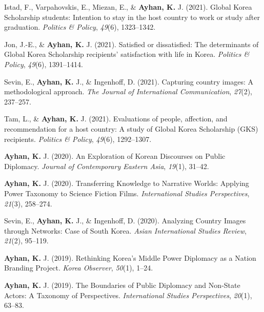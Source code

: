 \documentclass[11pt,a4paper,]{awesome-cv}
\begin{document}
\leavevmode{}%
Istad, F., Varpahovskis, E., Miezan, E., \& \textbf{Ayhan, K.} J.
(2021). Global {Korea} {Scholarship} students: {Intention} to stay in
the host country to work or study after graduation. \emph{Politics \&
Policy}, \emph{49}(6), 1323--1342.

\leavevmode{}%
Jon, J.-E., \& \textbf{Ayhan, K.} J. (2021). Satisfied or dissatisfied:
{The} determinants of {Global} {Korea} {Scholarship} recipients'
satisfaction with life in {Korea}. \emph{Politics \& Policy},
\emph{49}(6), 1391--1414.

\leavevmode{}%
Sevin, E., \textbf{Ayhan, K.} J., \& Ingenhoff, D. (2021). Capturing
country images: A methodological approach. \emph{The Journal of
International Communication}, \emph{27}(2), 237--257.

\leavevmode{}%
Tam, L., \& \textbf{Ayhan, K.} J. (2021). Evaluations of people,
affection, and recommendation for a host country: {A} study of {Global}
{Korea} {Scholarship} ({GKS}) recipients. \emph{Politics \& Policy},
\emph{49}(6), 1292--1307.

\leavevmode{}%
\textbf{Ayhan, K.} J. (2020). An {Exploration} of {Korean} {Discourses}
on {Public} {Diplomacy}. \emph{Journal of Contemporary Eastern Asia},
\emph{19}(1), 31--42.

\leavevmode{}%
\textbf{Ayhan, K.} J. (2020). Transferring {Knowledge} to {Narrative}
{Worlds}: {Applying} {Power} {Taxonomy} to {Science} {Fiction} {Films}.
\emph{International Studies Perspectives}, \emph{21}(3), 258--274.

\leavevmode{}%
Sevin, E., \textbf{Ayhan, K.} J., \& Ingenhoff, D. (2020). Analyzing
{Country} {Images} through {Networks}: {Case} of {South} {Korea}.
\emph{Asian International Studies Review}, \emph{21}(2), 95--119.

\leavevmode{}%
\textbf{Ayhan, K.} J. (2019). Rethinking {Korea}'s {Middle} {Power}
{Diplomacy} as a {Nation} {Branding} {Project}. \emph{Korea Observer},
\emph{50}(1), 1--24.

\leavevmode{}%
\textbf{Ayhan, K.} J. (2019). The {Boundaries} of {Public} {Diplomacy}
and {Non}-{State} {Actors}: {A} {Taxonomy} of {Perspectives}.
\emph{International Studies Perspectives}, \emph{20}(1), 63--83.
\end{document}
